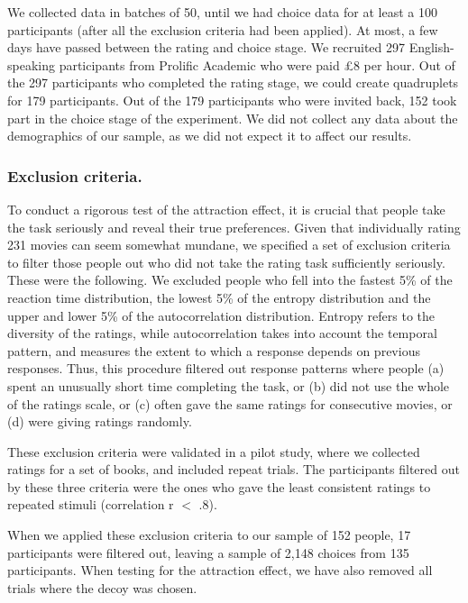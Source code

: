 \documentclass[12pt, a4paper]{article}
\begin{document}
We collected data in batches of 50, until we had choice data for at least a 100 participants (after all the exclusion criteria had been applied). At most, a few days have passed between the rating and choice stage. We recruited 297 English-speaking participants from Prolific Academic who were paid £8 per hour. Out of the 297 participants who completed the rating stage, we could create quadruplets for 179 participants. Out of the 179 participants who were invited back, 152 took part in the choice stage of the experiment. We did not collect any data about the demographics of our sample, as we did not expect it to affect our results.

\subsubsection*{Exclusion criteria.} \label{exclusion_ref}

To conduct a rigorous test of the attraction effect, it is crucial that people take the task seriously and reveal their true preferences. Given that individually rating 231 movies can seem somewhat mundane, we specified a set of exclusion criteria to filter those people out who did not take the rating task sufficiently seriously. These were the following. We excluded people who fell into the fastest 5\% of the reaction time distribution, the lowest 5\% of the entropy distribution and the upper and lower 5\% of the autocorrelation distribution. Entropy refers to the diversity of the ratings, while autocorrelation takes into account the temporal pattern, and measures the extent to which a response depends on previous responses. Thus, this procedure filtered out response patterns where people (a) spent an unusually short time completing the task, or (b) did not use the whole of the ratings scale, or (c) often gave the same ratings for consecutive movies, or (d) were giving ratings randomly.

These exclusion criteria were validated in a pilot study, where we collected ratings for a set of books, and included repeat trials. The participants filtered out by these three criteria were the ones who gave the least consistent ratings to repeated stimuli (correlation r $<$ .8).

When we applied these exclusion criteria to our sample of 152 people, 17 participants were filtered out, leaving a sample of 2,148 choices from 135 participants. When testing for the attraction effect, we have also removed all trials where the decoy was chosen.
\end{document}

